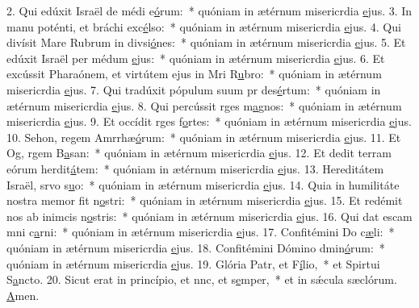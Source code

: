 2. Qui edúxit Israël de médi e\uline{ó}rum:~* quóniam in ætérnum misericrdia \uline{e}jus.
3. In manu poténti, et bráchi exc\uline{é}lso:~* quóniam in ætérnum misericrdia \uline{e}jus.
4. Qui divísit Mare Rubrum in divsi\uline{ó}nes:~* quóniam in ætérnum misericrdia \uline{e}jus.
5. Et edúxit Israël per médum \uline{e}jus:~* quóniam in ætérnum misericrdia \uline{e}jus.
6. Et excússit Pharaónem, et virtútem ejus in Mri R\uline{u}bro:~* quóniam in ætérnum misericrdia \uline{e}jus.
7. Qui tradúxit pópulum suum pr des\uline{é}rtum:~* quóniam in ætérnum misericrdia \uline{e}jus.
8. Qui percússit rges m\uline{a}gnos:~* quóniam in ætérnum misericrdia \uline{e}jus.
9. Et occídit rges f\uline{o}rtes:~* quóniam in ætérnum misericrdia \uline{e}jus.
10. Sehon, regem Amrrhæ\uline{ó}rum:~* quóniam in ætérnum misericrdia \uline{e}jus.
11. Et Og, rgem B\uline{a}san:~* quóniam in ætérnum misericrdia \uline{e}jus.
12. Et dedit terram eórum herdit\uline{á}tem:~* quóniam in ætérnum misericrdia \uline{e}jus.
13. Hereditátem Israël, srvo s\uline{u}o:~* quóniam in ætérnum misericrdia \uline{e}jus.
14. Quia in humilitáte nostra memor fit n\uline{o}stri:~* quóniam in ætérnum misericrdia \uline{e}jus.
15. Et redémit nos ab inimcis n\uline{o}stris:~* quóniam in ætérnum misericrdia \uline{e}jus.
16. Qui dat escam mni c\uline{a}rni:~* quóniam in ætérnum misericrdia \uline{e}jus.
17. Confitémini Do c\uline{æ}li:~* quóniam in ætérnum misericrdia \uline{e}jus.
18. Confitémini Dómino dmin\uline{ó}rum:~* quóniam in ætérnum misericrdia \uline{e}jus.
19. Glória Patr, et F\uline{í}lio,~* et Spirtui S\uline{a}ncto.
20. Sicut erat in princípio, et nnc, et s\uline{e}mper,~* et in sǽcula sæclórum. \uline{A}men.
